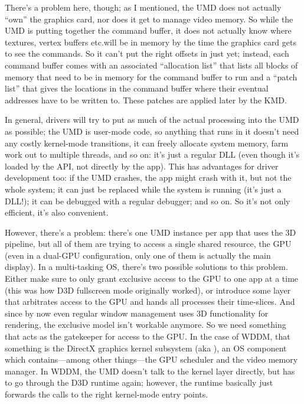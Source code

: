 There's a problem here, though; as I mentioned, the UMD does not actually 
``own'' the graphics card, nor does it get to manage video memory. So while the 
UMD is putting together the command buffer, it does not actually know where 
textures, vertex buffers etc.\@ will be in memory by the time the graphics card 
gets to see the commands. So it can't put the right offsets in just yet;
instead, each command buffer comes with an associated ``allocation list'' that 
lists all blocks of memory that need to be in memory for the command buffer to 
run and a ``patch list'' that gives the locations in the command buffer where 
their eventual addresses have to be written to. These patches are applied later 
by the KMD.

In general, drivers will try to put as much of the actual processing into the
UMD as possible; the UMD is user-mode code, so anything that runs in it doesn't
need any costly kernel-mode transitions, it can freely allocate system memory, 
farm work out to multiple threads, and so on: it's just a regular DLL (even 
though it's loaded by the API, not directly by the app). This has advantages 
for
driver development too: if the UMD crashes, the app might crash with it, but 
not the whole system; it can just be replaced while the system is running (it's
just a DLL!); it can be debugged with a regular debugger; and so on. So it's
not only efficient, it's also convenient.

However, there's a problem: there's one UMD instance per app that uses the 3D 
pipeline, but all of them are trying to access a single shared resource, the 
GPU (even in a dual-GPU configuration, only one of them is actually the main 
display).  In a multi-tasking OS, there's two possible solutions to this 
problem.  Either make sure to only grant exclusive access to the GPU to one app 
at a time (this was how D3D fullscreen mode originally worked), or introduce 
some layer that arbitrates access to the GPU and hands all processes their 
time-slices.  And since by now even regular window management uses 3D 
functionality for rendering, the exclusive model isn't workable anymore. So we 
need something that acts as the gatekeeper for access to the GPU. In the case 
of WDDM, that something is the DirectX graphics kernel subsystem (aka 
), an OS component which contains---among other things---the 
GPU scheduler and the video memory manager. In WDDM, the UMD doesn't talk to the
kernel layer directly, but has to go through the D3D runtime again; however,
the runtime basically just forwards the calls to the right kernel-mode entry
points.

